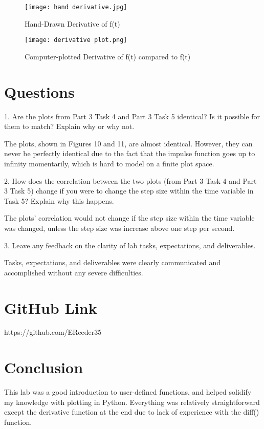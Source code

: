 \documentclass[12pt]{article}
\begin{document}
\begin{figure}[h!]
    \centering
    \texttt{[image: hand derivative.jpg]}
    \caption{Hand-Drawn Derivative of f(t)}
\end{figure}

\begin{figure}[h!]
    \centering
    \texttt{[image: derivative plot.png]}
    \caption{Computer-plotted Derivative of f(t) compared to f(t)}
\end{figure}

\newpage

\section{Questions}

1. Are the plots from Part 3 Task 4 and Part 3 Task 5 identical?  Is it possible for them to match?  Explain why or why not.

The plots, shown in Figures 10 and 11, are almost identical. However, they can never be perfectly identical due to the fact that the impulse function goes up to infinity momentarily, which is hard to model on a finite plot space.

2. How does the correlation between the two plots (from Part 3 Task 4 and Part 3 Task 5) change if you were to change the step size within the time variable in Task 5?  Explain why this happens.

The plots' correlation would not change if the step size within the time variable was changed, unless the step size was increase above one step per second.

3. Leave any feedback on the clarity of lab tasks, expectations, and deliverables.

Tasks, expectations, and deliverables were clearly communicated and accomplished without any severe difficulties.

\section{GitHub Link}

https://github.com/EReeder35

\section{Conclusion}

This lab was a good introduction to user-defined functions, and helped solidify my knowledge with plotting in Python. Everything was relatively straightforward except the derivative function at the end due to lack of experience with the diff() function.
\end{document}
